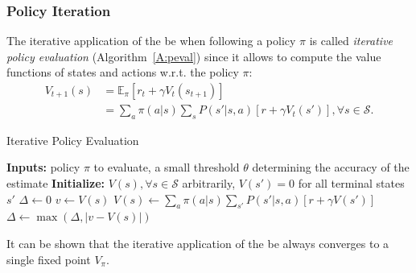 \subsubsection{Policy Iteration}
The iterative application of the \gls{be} when following a policy $\pi$ is called \textit{iterative policy evaluation} (Algorithm~\ref{A:peval}) since it allows to compute the value functions of states and actions w.r.t. the policy $\pi$:
\begin{align}
 V_{t+1} (s) &= \mathbb{E}_\pi[r_t + \gamma V_t(s_{t+1})]\nonumber\\
             &= \sum_a \pi(a|s) \sum_s P(s' | s, a)[r + \gamma V_t(s')], \forall s \in \mathcal{S}. 
\end{align}
\begin{algorithm}[t]
 \caption{Iterative Policy Evaluation}
 \begin{algorithmic}[1]\label{A:peval}
  \STATE \textbf{Inputs:} policy $\pi$ to evaluate, a small threshold $\theta$ determining the accuracy of the estimate
  \STATE \textbf{Initialize:} $V(s), \forall s \in \mathcal{S}$ arbitrarily, $V(s') = 0$ for all terminal states $s'$
  \REPEAT
  \STATE $\Delta \gets 0$
  \STATE $v \gets V(s)$
  \STATE $V(s) \gets \sum_a \pi(a|s) \sum_{s'} P(s'|s,a)[r + \gamma V(s')]$
  \STATE $\Delta \gets \max(\Delta, |v - V(s)|)$
  \ENDFOR
  \UNTIL{$\Delta < \theta$}
 \end{algorithmic}
\end{algorithm}
It can be shown that the iterative application of the \gls{be} always converges to a single fixed point $V_\pi$.


